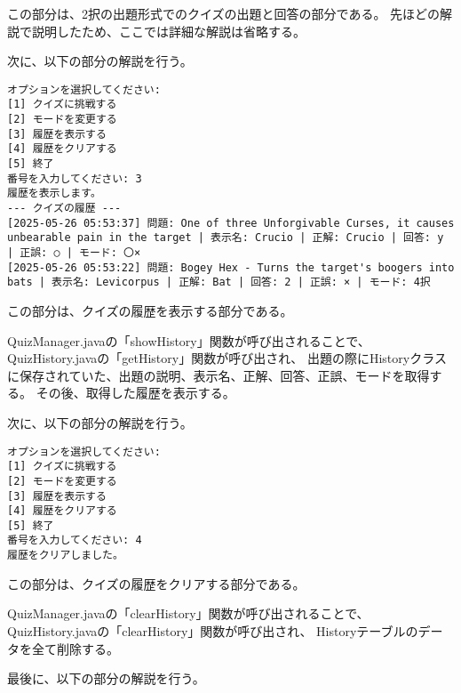 \documentclass[uplatex,dvipdfmx,a4paper]{jsarticle}
\begin{document}
\par この部分は、2択の出題形式でのクイズの出題と回答の部分である。
先ほどの解説で説明したため、ここでは詳細な解説は省略する。
\par 次に、以下の部分の解説を行う。
\begin{lstlisting}[style=result]
オプションを選択してください:
[1] クイズに挑戦する
[2] モードを変更する
[3] 履歴を表示する
[4] 履歴をクリアする
[5] 終了
番号を入力してください: 3
履歴を表示します。
--- クイズの履歴 ---
[2025-05-26 05:53:37] 問題: One of three Unforgivable Curses, it causes unbearable pain in the target | 表示名: Crucio | 正解: Crucio | 回答: y | 正誤: ○ | モード: 〇×
[2025-05-26 05:53:22] 問題: Bogey Hex - Turns the target's boogers into bats | 表示名: Levicorpus | 正解: Bat | 回答: 2 | 正誤: × | モード: 4択
\end{lstlisting}
\par この部分は、クイズの履歴を表示する部分である。
\par QuizManager.javaの「showHistory」関数が呼び出されることで、QuizHistory.javaの「getHistory」関数が呼び出され、
出題の際にHistoryクラスに保存されていた、出題の説明、表示名、正解、回答、正誤、モードを取得する。
その後、取得した履歴を表示する。
\par 次に、以下の部分の解説を行う。
\begin{lstlisting}[style=result]
オプションを選択してください:
[1] クイズに挑戦する
[2] モードを変更する
[3] 履歴を表示する
[4] 履歴をクリアする
[5] 終了
番号を入力してください: 4
履歴をクリアしました。
\end{lstlisting}
\par この部分は、クイズの履歴をクリアする部分である。
\par QuizManager.javaの「clearHistory」関数が呼び出されることで、QuizHistory.javaの「clearHistory」関数が呼び出され、
Historyテーブルのデータを全て削除する。
\par 最後に、以下の部分の解説を行う。
\end{document}
